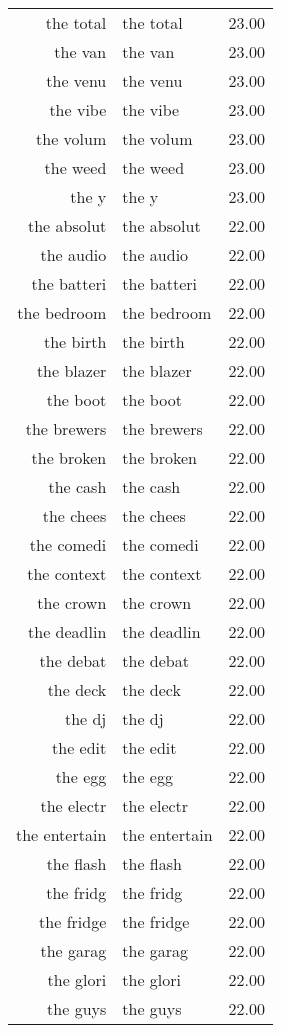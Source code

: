 \begin{table}[ht]
\begin{tabular}{rlr}
  the total & the total & 23.00 \\ 
  the van & the van & 23.00 \\ 
  the venu & the venu & 23.00 \\ 
  the vibe & the vibe & 23.00 \\ 
  the volum & the volum & 23.00 \\ 
  the weed & the weed & 23.00 \\ 
  the y & the y & 23.00 \\ 
  the absolut & the absolut & 22.00 \\ 
  the audio & the audio & 22.00 \\ 
  the batteri & the batteri & 22.00 \\ 
  the bedroom & the bedroom & 22.00 \\ 
  the birth & the birth & 22.00 \\ 
  the blazer & the blazer & 22.00 \\ 
  the boot & the boot & 22.00 \\ 
  the brewers & the brewers & 22.00 \\ 
  the broken & the broken & 22.00 \\ 
  the cash & the cash & 22.00 \\ 
  the chees & the chees & 22.00 \\ 
  the comedi & the comedi & 22.00 \\ 
  the context & the context & 22.00 \\ 
  the crown & the crown & 22.00 \\ 
  the deadlin & the deadlin & 22.00 \\ 
  the debat & the debat & 22.00 \\ 
  the deck & the deck & 22.00 \\ 
  the dj & the dj & 22.00 \\ 
  the edit & the edit & 22.00 \\ 
  the egg & the egg & 22.00 \\ 
  the electr & the electr & 22.00 \\ 
  the entertain & the entertain & 22.00 \\ 
  the flash & the flash & 22.00 \\ 
  the fridg & the fridg & 22.00 \\ 
  the fridge & the fridge & 22.00 \\ 
  the garag & the garag & 22.00 \\ 
  the glori & the glori & 22.00 \\ 
  the guys & the guys & 22.00 \\ 

\end{tabular}
\end{table}
